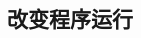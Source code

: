 \documentclass[class=book, crop=false]{standalone}
\begin{document}
\begin{CJK}{UTF8}{gbsn}

\chapter{改变程序运行}

















\cleardoublepage

\end{CJK}
\end{document}
